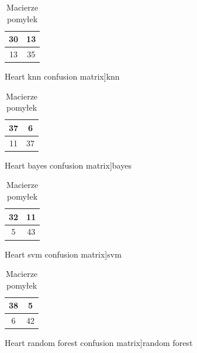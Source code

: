 \documentclass{classrep}
\begin{document}
{{{                \begin{table}[!htbp]
                    \begin{minipage}{.24\textwidth}
                        \centering
                        \begin{tabular}{|c|c|}
                            \hline
                            30 & 13 \\ \hline
                            13 & 35 \\ \hline
                        \end{tabular}
                        \caption
                        [Heart knn confusion matrix]{knn}
                        \label{Heart_knn_confusion_matrix}
                    \end{minipage}
                    \hfill
                    \begin{minipage}{.24\textwidth}
                        \centering
                        \begin{tabular}{|c|c|}
                            \hline
                            37 & 6 \\ \hline
                            11 & 37 \\ \hline
                        \end{tabular}
                        \caption
                        [Heart bayes confusion matrix]{bayes}
                        \label{Heart_bayes_confusion_matrix}
                    \end{minipage}
                    \hfill
                    \begin{minipage}{.24\textwidth}
                        \centering
                        \begin{tabular}{|c|c|}
                            \hline
                            32 & 11 \\ \hline
                            5 & 43 \\ \hline
                        \end{tabular}
                        \caption
                        [Heart svm confusion matrix]{svm}
                        \label{Heart_svm_confusion_matrix}
                    \end{minipage}
                    \hfill
                    \begin{minipage}{.24\textwidth}
                        \centering
                        \begin{tabular}{|c|c|}
                            \hline
                            38 & 5 \\ \hline
                            6 & 42 \\ \hline
                        \end{tabular}
                        \caption
                        [Heart random forest confusion matrix]{random forest}
                        \label{Heart_random_forest_confusion_matrix}
                    \end{minipage}
                    \caption{Macierze pomyłek}
                \end{table}
                \FloatBarrier

}}}
\end{document}
